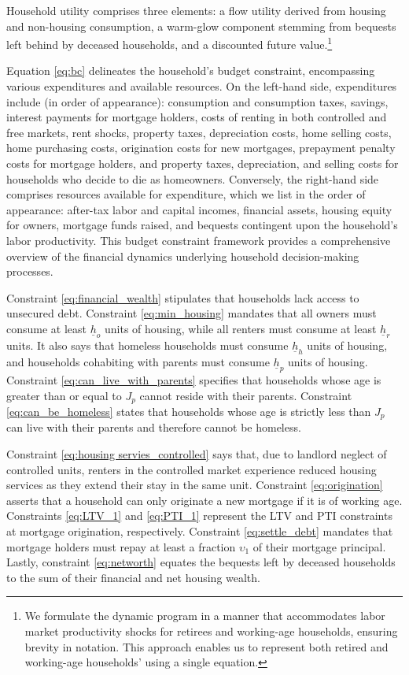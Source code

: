\documentclass[parskip=full]{article}
\begin{document}
\noindent Household utility comprises three elements: a flow utility derived from housing and non-housing consumption, a warm-glow component stemming from bequests left behind by deceased households, and a discounted future value.\footnote{We formulate the dynamic program in a manner that accommodates labor market productivity shocks for retirees and working-age households, ensuring brevity in notation. This approach enables us to represent both retired and working-age households' using a single equation.}

Equation \eqref{eq:bc} delineates the household's budget constraint, encompassing various expenditures and available resources. On the left-hand side, expenditures include (in order of appearance): consumption and consumption taxes, savings, interest payments for mortgage holders, costs of renting in both controlled and free markets, rent shocks, property taxes, depreciation costs, home selling costs, home purchasing costs, origination costs for new mortgages, prepayment penalty costs for mortgage holders, and property taxes, depreciation, and selling costs for households who decide to die as homeowners. Conversely, the right-hand side comprises resources available for expenditure, which we list in the order of appearance: after-tax labor and capital incomes, financial assets, housing equity for owners, mortgage funds raised, and bequests contingent upon the household's labor productivity. This budget constraint framework provides a comprehensive overview of the financial dynamics underlying household decision-making processes.

Constraint \eqref{eq:financial_wealth} stipulates that households lack access to unsecured debt. Constraint \eqref{eq:min_housing} mandates that all owners must consume at least $\underline{h}_{o}$ units of housing, while all renters must consume at least $\underline{h}_{r}$ units. It also says that homeless households must consume $\underline{h}_{h}$ units of housing, and households cohabiting with parents must consume $\underline{h}_{p}$ units of housing. Constraint \eqref{eq:can_live_with_parents} specifies that households whose age is greater than or equal to $J_{p}$ cannot reside with their parents. Constraint \eqref{eq:can_be_homeless} states that households whose age is strictly less than $J_{p}$ can live with their parents and therefore cannot be homeless.

Constraint \eqref{eq:housing servies_controlled} says that, due to landlord neglect of controlled units, renters in the controlled market experience reduced housing services as they extend their stay in the same unit. Constraint \eqref{eq:origination} asserts that a household can only originate a new mortgage if it is of working age. Constraints \eqref{eq:LTV_1} and \eqref{eq:PTI_1} represent the LTV and PTI constraints at mortgage origination, respectively. Constraint \eqref{eq:settle_debt} mandates that mortgage holders must repay at least a fraction $\upsilon_{1}$ of their mortgage principal. Lastly, constraint \eqref{eq:networth} equates the bequests left by deceased households to the sum of their financial and net housing wealth.
\end{document}
